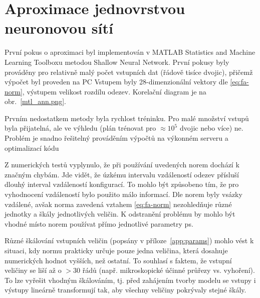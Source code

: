 \section{Aproximace jednovrstvou neuronovou sítí}
První pokus o aproximaci byl implementován v MATLAB Statistics and Machine Learning Toolboxu metodou Shallow Neural Network. 
První pokusy byly prováděny pro relativně malý počet vstupních dat (řádově tisíce dvojic), přičemž výpočet byl proveden na 
PC Vstupem byly 28-dimenzionální vektory dle \eqref{eq:fa-norm}, výstupem 
velikost rozdílu odezev. Korelační diagram je na obr.~\ref{mtl_ann.png}. 

Prvním nedostatkem metody byla rychlost tréninku. Pro malé množství vstupů byla přijatelná, ale ve výhledu (plán trénovat pro $\approx 10^5$ dvojic nebo více) 
ne. Problém je snadno řešitelný prováděním výpočtů na výkonném serveru a optimalizací kódu 

Z numerických testů vyplynulo, že při používání uvedených norem dochází k značným chybám. 
Jde vidět, že 
úzkému intervalu vzdáleností odezev přísluší dlouhý interval vzdáleností konfigurací. To mohlo být způsobeno tím, že pro vyhodnocení vzdáleností 
bylo použito málo informací. Dle norem byly vsázky vzdálené, avšak norma zavedená vztahem \eqref{eq:fa-norm} nezohledňuje různé jednotky a škály 
jednotlivých veličin. K odstranění problému by mohlo být vhodné místo norem používat přímo jednotlivé parametry \ac{ps}.

Různé škálování vstupních veličin (popsány v příloze~\ref{app:params}) mohlo vést k situaci, kdy normu prakticky určuje pouze jedna veličina, 
která dosahuje numerických hodnot vyšších, než ostatní. 
To souhlasí s faktem, že vstupní veličiny se liší až o $>30$ řádů (např. mikroskopické účinné průřezy vs. vyhoření). To lze vyřešit vhodným škálováním, 
tj. před zahájením tvorby modelu se vstupy i výstupy lineárně transformují tak, aby všechny veličiny pokrývaly stejné škály. 

